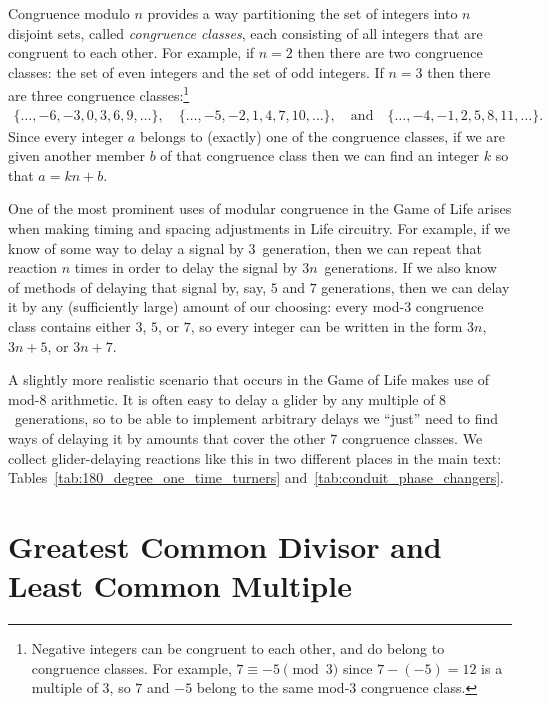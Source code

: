 Congruence modulo $n$ provides a way partitioning the set of integers into $n$ disjoint sets, called \emph{congruence classes}, each consisting of all integers that are congruent to each other. For example, if $n = 2$ then there are two congruence classes: the set of even integers and the set of odd integers. If $n = 3$ then there are three congruence classes:\footnote{Negative integers can be congruent to each other, and do belong to congruence classes. For example, $7 \equiv -5 \pmod{3}$ since $7-(-5) = 12$ is a multiple of $3$, so $7$ and $-5$ belong to the same mod-$3$ congruence class.}
\begin{align*}
	\{\ldots, -6, -3, 0, 3, 6, 9, \ldots\}, \quad \{\ldots, -5, -2, 1, 4, 7, 10, \ldots\}, \quad \text{and} \quad \{\ldots, -4, -1, 2, 5, 8, 11, \ldots\}.
\end{align*}
Since every integer $a$ belongs to (exactly) one of the congruence classes, if we are given another member $b$ of that congruence class then we can find an integer $k$ so that $a = kn + b$.

One of the most prominent uses of modular congruence in the Game of Life arises when making timing and spacing adjustments in Life circuitry. For example, if we know of some way to delay a signal by $3$~generation, then we can repeat that reaction $n$ times in order to delay the signal by $3n$~generations. If we also know of methods of delaying that signal by, say, $5$ and $7$ generations, then we can delay it by any (sufficiently large) amount of our choosing: every mod-$3$ congruence class contains either $3$, $5$, or $7$, so every integer can be written in the form $3n$, $3n + 5$, or $3n + 7$.

A slightly more realistic scenario that occurs in the Game of Life makes use of mod-$8$ arithmetic. It is often easy to delay a glider by any multiple of $8$~generations, so to be able to implement arbitrary delays we ``just'' need to find ways of delaying it by amounts that cover the other $7$ congruence classes. We collect glider-delaying reactions like this in two different places in the main text: Tables~\ref{tab:180_degree_one_time_turners} and~\ref{tab:conduit_phase_changers}.


\section{Greatest Common Divisor and Least Common Multiple}\label{sec:gcd}

